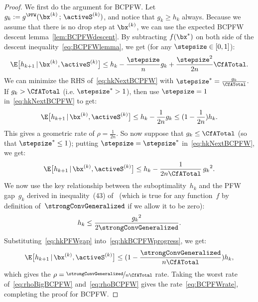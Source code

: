 \documentclass{article}
\begin{document}
\begin{proof}
We first do the argument for BCPFW. Let $g_k := g^\PFW(\bx^{(k)} \,;\, \activeS^{(k)})$, and notice that $g_k \geq h_k$ always. Because we assume that there is no drop step at $\bx^{(k)}$, we can use the expected BCPFW descent lemma~\ref{lem:BCPFWdescent}. By subtracting $f(\bx^*)$ on both side of the descent inequality~\eqref{eq:BCPFWlemma}, we get (for any $\stepsize \in [0,1]$):
\begin{equation} \label{eq:hkNextBCPFW}
\E\big[h_{k+1} \,|\, \bx^{(k)}, \activeS^{(k)} \big]
\le h_k -  \frac{\stepsize}{n} g_k
  + \frac{\stepsize^2}{2n} \CfATotal . 
\end{equation}
We can minimize the RHS of~\eqref{eq:hkNextBCPFW} with $\stepsize^* = \frac{g_k}{\CfATotal}$. If $g_k > \CfATotal$ (i.e. $\stepsize^* > 1$), then use $\stepsize = 1$ in~\eqref{eq:hkNextBCPFW} to get:
\begin{equation} \label{eq:rhoBigBCPFW}
\E\big[h_{k+1} \,|\, \bx^{(k)}, \activeS^{(k)} \big]
\le h_k -  \frac{1}{2n} g_k \leq (1-\frac{1}{2n}) h_k .
\end{equation}
This gives a geometric rate of $\rho = \frac{1}{2n}$. So now suppose that $g_k \leq \CfATotal$ (so that $\stepsize^* \leq 1$); putting $\stepsize = \stepsize^*$ in~\eqref{eq:hkNextBCPFW}, we get:
\begin{equation} \label{eq:hkBCPFWprogress}
\E\big[h_{k+1} \,|\, \bx^{(k)}, \activeS^{(k)} \big]
\le h_k -  \frac{1}{2n \CfATotal} \, {g_k}^2 .
\end{equation}
We now use the key relationship between the suboptimality~$h_k$ and the PFW gap~$g_k$ derived in inequality~(43) of~\citet{LacosteJulien2015linearFW} (which is true for any function~$f$ by definition of~$\strongConvGeneralized$ if we allow it to be zero):
\begin{equation} \label{eq:hkPFWgap}
h_k \leq \frac{{g_k}^2}{2 \strongConvGeneralized} .\textsl{}
\end{equation}
Substituting~\eqref{eq:hkPFWgap} into~\eqref{eq:hkBCPFWprogress}, we get:
\begin{equation} \label{eq:rhoBCPFW}
\E\big[h_{k+1} \,|\, \bx^{(k)}, \activeS^{(k)} \big] \leq (1-\frac{\strongConvGeneralized}{n  \CfATotal}) h_k ,
\end{equation}
which gives the $\rho = \nicefrac{\strongConvGeneralized}{n  \CfATotal}$ rate. Taking the worst rate of~\eqref{eq:rhoBigBCPFW} and~\eqref{eq:rhoBCPFW} gives the rate~\eqref{eq:BCPFWrate}, completing 
the proof for BCPFW.


\end{proof}
\end{document}
